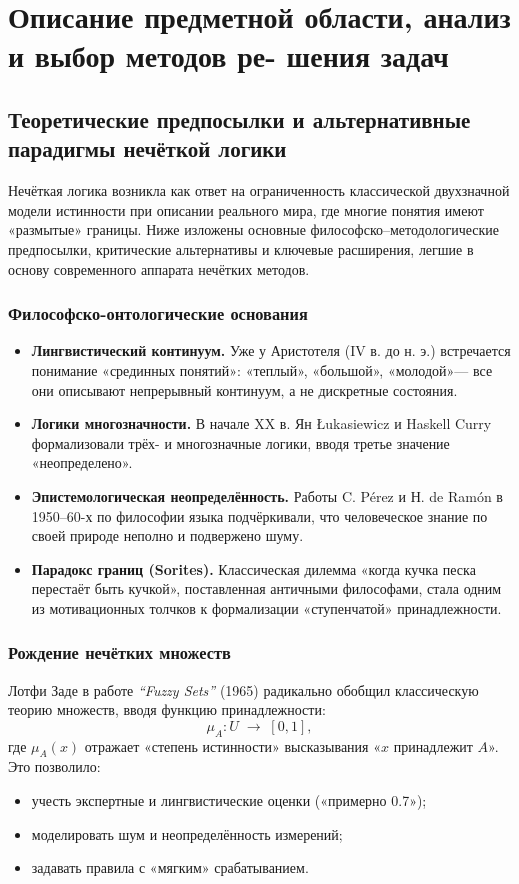 \section{Описание предметной области, анализ и выбор методов ре-
шения задач}
\label{sec:software_design}

\subsection{Теоретические предпосылки и альтернативные парадигмы нечёткой логики}
\label{subsec:theory_foundations_expand}

Нечёткая логика возникла как ответ на ограниченность классической двухзначной модели истинности при описании реального мира, где многие понятия имеют «размытые» границы. Ниже изложены основные философско–методологические предпосылки, критические альтернативы и ключевые расширения, легшие в основу современного аппарата нечётких методов.

\subsubsection{Философско-онтологические основания}
\begin{itemize}
  \item \textbf{Лингвистический континуум.} Уже у Аристотеля (IV в. до н. э.) встречается понимание «срединных понятий»: «теплый», «большой», «молодой»— все они описывают непрерывный континуум, а не дискретные состояния.
  \item \textbf{Логики многозначности.} В начале XX в. Ян Łukasiewicz и Haskell Curry формализовали трёх- и многозначные логики, вводя третье значение «неопределено».
  \item \textbf{Эпистемологическая неопределённость.} Работы C. Pérez и Н. de Ramón в 1950–60-х по философии языка подчёркивали, что человеческое знание по своей природе неполно и подвержено шуму.
  \item \textbf{Парадокс границ (Sorites).} Классическая дилемма «когда кучка песка перестаёт быть кучкой», поставленная античными философами, стала одним из мотивационных толчков к формализации «ступенчатой» принадлежности.
\end{itemize}

\subsubsection{Рождение нечётких множеств}
Лотфи Заде в работе \emph{“Fuzzy Sets”} (1965) радикально обобщил классическую теорию множеств, вводя функцию принадлежности:
\begin{equation}
  \mu_A: U \;\to\; [0,1],
  \label{eq:basic_mu}
\end{equation}
где $\mu_A(x)$ отражает «степень истинности» высказывания «$x$ принадлежит $A$». Это позволило:
\begin{itemize}
  \item учесть экспертные и лингвистические оценки («примерно 0.7»);
  \item моделировать шум и неопределённость измерений;
  \item задавать правила с «мягким» срабатыванием.
\end{itemize}

